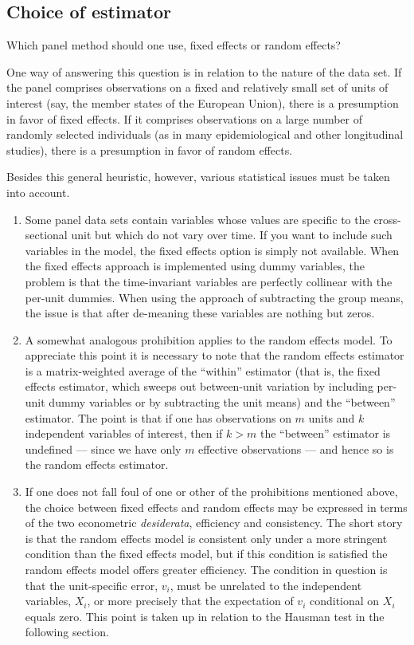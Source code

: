 \subsection{Choice of estimator}
\label{panel-choice}

Which panel method should one use, fixed effects or random effects?

One way of answering this question is in relation to the nature of the
data set.  If the panel comprises observations on a fixed and
relatively small set of units of interest (say, the member states of
the European Union), there is a presumption in favor of fixed effects.
If it comprises observations on a large number of randomly selected
individuals (as in many epidemiological and other longitudinal
studies), there is a presumption in favor of random effects.

Besides this general heuristic, however, various statistical
issues must be taken into account.

\begin{enumerate}

\item Some panel data sets contain variables whose values are specific
  to the cross-sectional unit but which do not vary over time.  If you
  want to include such variables in the model, the fixed effects
  option is simply not available.  When the fixed effects approach is
  implemented using dummy variables, the problem is that the
  time-invariant variables are perfectly collinear with the per-unit
  dummies.  When using the approach of subtracting the group means,
  the issue is that after de-meaning these variables are nothing but
  zeros.
\item A somewhat analogous prohibition applies to the random effects
  model.  To appreciate this point it is necessary to note that the
  random effects estimator is a matrix-weighted average of the
  ``within'' estimator (that is, the fixed effects estimator, which
  sweeps out between-unit variation by including per-unit dummy
  variables or by subtracting the unit means) and the ``between''
  estimator.  The point is that if one has observations on $m$ units
  and $k$ independent variables of interest, then if $k>m$ the
  ``between'' estimator is undefined --- since we have only $m$
  effective observations --- and hence so is the random effects
  estimator.
\item If one does not fall foul of one or other of the prohibitions
  mentioned above, the choice between fixed effects and random effects
  may be expressed in terms of the two econometric
  \textit{desiderata}, efficiency and consistency.  The short story is
  that the random effects model is consistent only under a more
  stringent condition than the fixed effects model, but if this
  condition is satisfied the random effects model offers greater
  efficiency.  The condition in question is that the unit-specific
  error, $v_i$, must be unrelated to the independent variables, $X_i$,
  or more precisely that the expectation of $v_i$ conditional on
  $X_i$ equals zero.  This point is taken up in relation to the
  Hausman test in the following section.

\end{enumerate}

